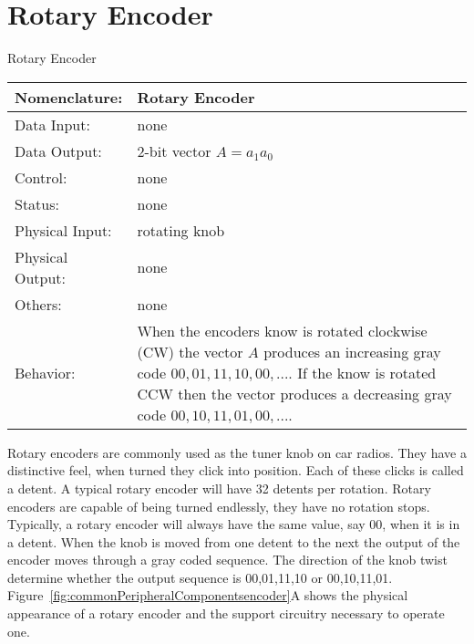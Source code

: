         \section{Rotary Encoder}
            \label{page:rotary}
            \begin{buildingblock}{Rotary Encoder}
                \begin{tabular}{|l|p{3.5in}|} \hline
                    Nomenclature:  & Rotary Encoder                           \\ \hline
                    Data Input:    & none         \\ \hline
                    Data Output:   & 2-bit vector $A=a_1 a_0$   \\ \hline
                    Control:       & none           \\ \hline
                    Status:        & none                                   \\ \hline
                    Physical Input:& rotating knob        \\ \hline
                    Physical Output:& none        \\ \hline
                    Others:        & none                   \\ \hline
                    Behavior:      & When the encoders know is rotated clockwise (CW) the
                    vector $A$ produces an increasing gray code $00, 01, 11, 10, 00, ...$.
                    If the know is rotated CCW then the vector produces a decreasing gray
                    code $00,10,11,01,00, ...$. \\ \hline
                \end{tabular}
            \end{buildingblock}

            Rotary encoders are commonly used as the tuner knob on car radios.
            They have a distinctive feel, when turned they click into
            position.  Each of these clicks is called a detent.   A typical
            rotary encoder will have 32 detents per rotation.  Rotary encoders
            are capable of being turned endlessly,
            they have no rotation stops.  Typically, a rotary encoder will always have the
            same value, say 00, when it is in a detent.  When the knob is moved
            from one detent to the next the output of the encoder moves through
            a gray coded sequence.  The direction of the knob twist determine whether the
            output sequence is 00,01,11,10 or 00,10,11,01.   
                Figure~\ref{fig:commonPeripheralComponentsencoder}A shows the physical appearance of a rotary
                encoder and the support circuitry necessary to operate one.

